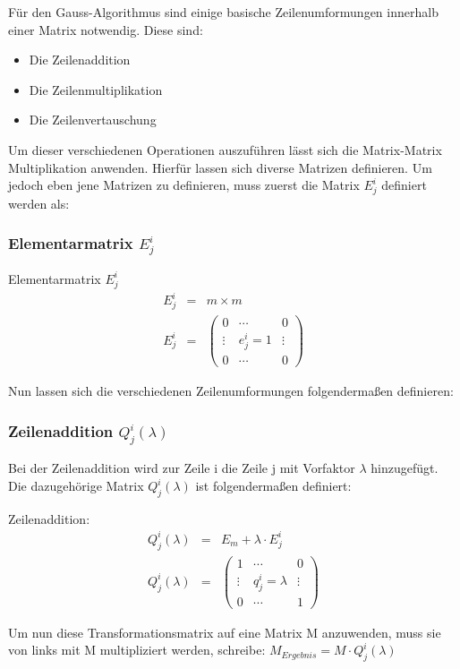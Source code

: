 
Für den Gauss-Algorithmus sind einige basische Zeilenumformungen innerhalb einer Matrix notwendig. Diese sind:

\begin{itemize}
\item Die Zeilenaddition
\item Die Zeilenmultiplikation
\item Die Zeilenvertauschung
\end{itemize}

Um dieser verschiedenen Operationen auszuführen lässt sich die Matrix-Matrix Multiplikation anwenden. Hierfür lassen sich diverse Matrizen definieren.
Um jedoch eben jene Matrizen zu definieren, muss zuerst die Matrix $E^i_j$ definiert werden als:

\subsubsection{Elementarmatrix $E^i_j$}
\begin{Def} Elementarmatrix $E^i_j$
\begin{eqnarray}
	E^i_j &=& m \times m \\
 	E^i_j &=& 
	 	\begin{pmatrix}
	 	0 & \cdots & 0 \\
	 	\vdots & e^i_j = 1 & \vdots \\
	 	0 & \cdots & 0 
 	\end{pmatrix}
\end{eqnarray}
\end{Def}

\vspace{8pt}

\raggedright Nun lassen sich die verschiedenen Zeilenumformungen folgendermaßen definieren:
\subsubsection{Zeilenaddition $Q^i_j(\lambda)$}
Bei der Zeilenaddition wird zur Zeile i die Zeile j mit Vorfaktor $\lambda$ hinzugefügt.
Die dazugehörige Matrix $Q^i_j(\lambda)$ ist folgendermaßen definiert:
\begin{Def} Zeilenaddition:
\begin{eqnarray}
	Q^i_j(\lambda) & = & E_m + \lambda \cdot E^i_j \\
	Q^i_j(\lambda) & = & 
	\begin{pmatrix}
	1 & \cdots & 0 \\ 
	\vdots &  q^i_j = \lambda & \vdots \\  
	0 & \cdots & 1
	\end{pmatrix} 
\end{eqnarray}
\end{Def}
\raggedright
Um nun diese Transformationsmatrix auf eine Matrix M anzuwenden, muss sie von links mit M multipliziert werden, schreibe: $M_{Ergebnis} = M \cdot Q^i_j(\lambda)$

